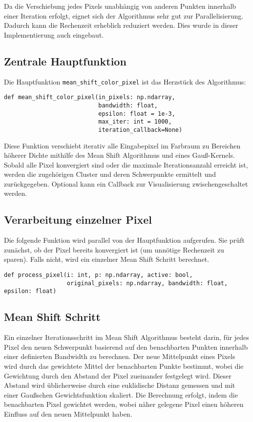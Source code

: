 Da die Verschiebung jedes Pixels unabhängig von anderen Punkten innerhalb einer Iteration erfolgt, eignet sich der Algorithmus sehr gut zur Parallelisierung. Dadurch kann die Rechenzeit erheblich reduziert werden. Dies wurde in dieser Implementierung auch eingebaut.

\subsection*{Zentrale Hauptfunktion}

Die Hauptfunktion \texttt{mean\_shift\_color\_pixel} ist das Herzstück des Algorithmus:

\begin{verbatim}
def mean_shift_color_pixel(in_pixels: np.ndarray, 
                           bandwidth: float,
                           epsilon: float = 1e-3,
                           max_iter: int = 1000,
                           iteration_callback=None)
\end{verbatim}

Diese Funktion verschiebt iterativ alle Eingabepixel im Farbraum zu Bereichen höherer Dichte mithilfe des Mean Shift Algorithmus und eines Gauß-Kernels. Sobald alle Pixel konvergiert sind oder die maximale Iterationsanzahl erreicht ist, werden die zugehörigen Cluster und deren Schwerpunkte ermittelt und zurückgegeben. Optional kann ein Callback zur Visualisierung zwischengeschaltet werden.

\subsection*{Verarbeitung einzelner Pixel}

Die folgende Funktion wird parallel von der Hauptfunktion aufgerufen. Sie prüft zunächst, ob der Pixel bereits konvergiert ist (um unnötige Rechenzeit zu sparen). Falls nicht, wird ein einzelner Mean Shift Schritt berechnet.

\begin{verbatim}
def process_pixel(i: int, p: np.ndarray, active: bool,
                  original_pixels: np.ndarray, bandwidth: float, epsilon: float)
\end{verbatim}

\subsection*{Mean Shift Schritt}

Ein einzelner Iterationsschritt im Mean Shift Algorithmus besteht darin, für jedes Pixel den neuen Schwerpunkt basierend auf den benachbarten Punkten innerhalb einer definierten Bandwidth zu berechnen. Der neue Mittelpunkt eines Pixels wird durch das gewichtete Mittel der benachbarten Punkte bestimmt, wobei die Gewichtung durch den Abstand der Pixel zueinander festgelegt wird. Dieser Abstand wird üblicherweise durch eine euklidische Distanz gemessen und mit einer Gaußschen Gewichtsfunktion skaliert. Die Berechnung erfolgt, indem die benachbarten Pixel gewichtet werden, wobei näher gelegene Pixel einen höheren Einfluss auf den neuen Mittelpunkt haben.

